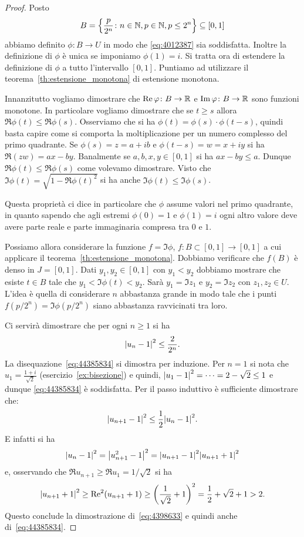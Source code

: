 \begin{proof}
Posto 
\[
B = {\left\{ \frac{p}{2^n}\colon n\in {\mathbb N}, p\in {\mathbb N}, p\le 2^n \right\}} \subseteq [0,1]
\]
abbiamo definito $\phi\colon B\to U$ in modo che \eqref{eq:4012387}
sia soddisfatta. 
Inoltre la definizione di $\phi$ è unica se imponiamo  
$\phi(1)=i$.
Si tratta ora di estendere la definizione di $\phi$ a tutto 
l'intervallo $[0,1]$. 
Puntiamo ad utilizzare il teorema~\ref{th:estensione_monotona} di 
estensione monotona.

Innanzitutto vogliamo dimostrare che $\operatorname{Re} \varphi\colon B\to {\mathbb R}$ 
e $\operatorname{Im} \varphi\colon B\to {\mathbb R}$ sono funzioni monotone.
In particolare vogliamo dimostrare che se $t\ge s$ allora 
$\Re \phi(t) \le \Re \phi(s)$.
Osserviamo che si ha $\phi(t) = \phi(s)\cdot \phi(t-s)$, 
quindi basta capire come si comporta la moltiplicazione per un 
numero complesso del primo quadrante.
Se $\phi(s)=z=a+ib$ e $\phi(t-s)=w=x+iy$ si ha
$\Re (zw) = ax-by$. 
Banalmente se $a,b,x,y\in[0,1]$ si ha $ax-by \le a$. 
Dunque $\Re \phi(t)\le \Re \phi(s)$ come volevamo dimostrare.
Visto che $\Im \phi(t) = \sqrt{1-\Re \phi(t)^2}$ si ha
anche $\Im \phi(t) \le \Im \phi(s)$.

Questa proprietà ci dice in particolare che $\phi$ assume valori 
nel primo quadrante, in quanto sapendo che agli estremi 
$\phi(0) = 1$ 
e $\phi(1)=i$ ogni altro valore deve avere parte reale 
e parte immaginaria compresa tra $0$ e $1$.

Possiamo allora considerare la funzione 
$f=\Im \phi$, $f\colon B\subset [0,1]\to[0,1]$
a cui applicare il teorema~\ref{th:estensione_monotona}.
Dobbiamo verificare che $f(B)$ è denso in $J=[0,1]$. 
Dati $y_1,y_2\in [0,1]$ con $y_1<y_2$ dobbiamo mostrare che esiste $t\in B$ tale 
che $y_1 < \Im \phi(t) < y_2$.
Sarà $y_1=\Im z_1$ e $y_2=\Im z_2$ con $z_1,z_2\in U$.
L'idea è quella di considerare $n$ abbastanza grande in modo tale 
che i punti $f(p/2^n)= \Im \phi(p/2^n)$ siano abbastanza ravvicinati tra loro.

Ci servirà dimostrare che per ogni $n\ge 1$ si ha
\begin{equation}
  \label{eq:44385834}
  {\left|u_n-1\right|}^2 \le \frac{2}{2^n}.
\end{equation}
La disequazione~\eqref{eq:44385834} si dimostra per induzione.
Per $n=1$ si nota che 
$u_1=\frac{1+i}{\sqrt 2}$ (esercizio~\ref{ex:bisezione}) e quindi,
${\left|u_1-1\right|}^2 = \dots = 2-\sqrt 2 \le 1$ e dunque 
\eqref{eq:44385834} è soddisfatta.
Per il passo induttivo è sufficiente dimostrare che:
\begin{equation}
  \label{eq:4398633}
   {\left|u_{n+1}-1\right|}^2 \le \frac 1 2 {\left|u_n-1\right|}^2.
\end{equation}
E infatti si ha
\[
  {\left|u_n-1\right|}^2
  = {\left|u_{n+1}^2-1\right|}^2
  = {\left|u_{n+1}-1\right|}^2 {\left|u_{n+1}+1\right|}^2
\]
e, osservando che $\Re u_{n+1}\ge \Re u_1 = 1/\sqrt 2$ si ha
\[
 {\left|u_{n+1}+1\right|}^2 \ge \operatorname{Re}^2(u_{n+1}+1) 
 \ge {\left( \frac{1}{\sqrt 2}+1 \right)}^2 = \frac 1 2 + \sqrt 2 + 1 > 2.
\]
Questo conclude la dimostrazione di~\eqref{eq:4398633} e 
quindi anche di~\eqref{eq:44385834}.


\end{proof}
